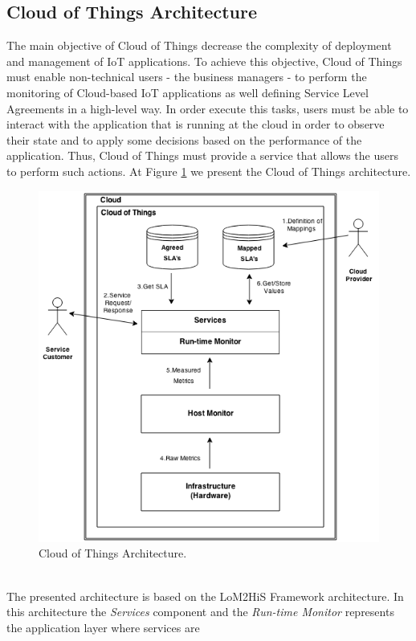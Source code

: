\subsection{Cloud of Things Architecture}
\label{sub:cloud_of_things_architecture}
The main objective of Cloud of Things decrease the complexity of deployment and management of IoT applications. To achieve this objective, Cloud of Things must enable non-technical users - the business managers - to perform the
monitoring of Cloud-based IoT applications as well defining Service Level Agreements in a high-level way. In order execute this tasks, users must be able to interact with the application that is running at the cloud in order
to observe their state and to apply some decisions based on the performance of the application. Thus, Cloud of Things must provide a service that allows the users to perform such actions. At Figure \ref{fig:cloud_of_things_architecture}
we present the Cloud of Things architecture.
\vspace{1in}
\begin{figure}[h!]
  \centering
  \includegraphics[width=.8\textwidth]{./images/cloud-of-things-architecture}
  \caption{Cloud of Things Architecture.}
  \label{fig:cloud_of_things_architecture}
\end{figure}\\
The presented architecture is based on the LoM2HiS Framework \cite{emeakaroha2010low} architecture. In this architecture the \textit{Services} component and the \textit{Run-time Monitor} represents the application layer where services are
